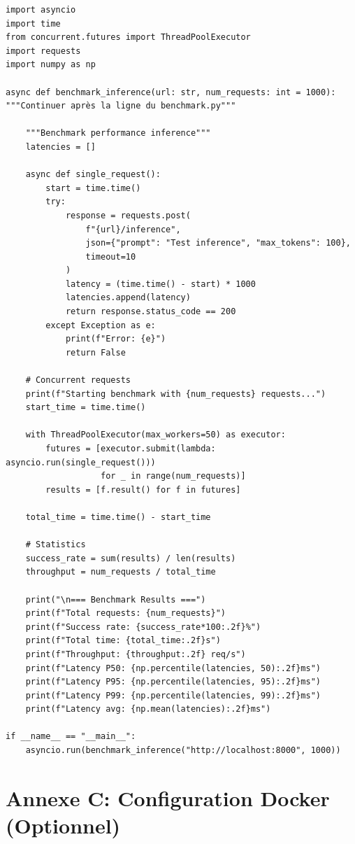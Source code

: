 \documentclass[12pt,a4paper]{article}
\begin{document}
\begin{lstlisting}[caption={benchmark.py}]
import asyncio
import time
from concurrent.futures import ThreadPoolExecutor
import requests
import numpy as np

async def benchmark_inference(url: str, num_requests: int = 1000):
"""Continuer après la ligne du benchmark.py"""

    """Benchmark performance inference"""
    latencies = []
    
    async def single_request():
        start = time.time()
        try:
            response = requests.post(
                f"{url}/inference",
                json={"prompt": "Test inference", "max_tokens": 100},
                timeout=10
            )
            latency = (time.time() - start) * 1000
            latencies.append(latency)
            return response.status_code == 200
        except Exception as e:
            print(f"Error: {e}")
            return False
    
    # Concurrent requests
    print(f"Starting benchmark with {num_requests} requests...")
    start_time = time.time()
    
    with ThreadPoolExecutor(max_workers=50) as executor:
        futures = [executor.submit(lambda: asyncio.run(single_request())) 
                   for _ in range(num_requests)]
        results = [f.result() for f in futures]
    
    total_time = time.time() - start_time
    
    # Statistics
    success_rate = sum(results) / len(results)
    throughput = num_requests / total_time
    
    print("\n=== Benchmark Results ===")
    print(f"Total requests: {num_requests}")
    print(f"Success rate: {success_rate*100:.2f}%")
    print(f"Total time: {total_time:.2f}s")
    print(f"Throughput: {throughput:.2f} req/s")
    print(f"Latency P50: {np.percentile(latencies, 50):.2f}ms")
    print(f"Latency P95: {np.percentile(latencies, 95):.2f}ms")
    print(f"Latency P99: {np.percentile(latencies, 99):.2f}ms")
    print(f"Latency avg: {np.mean(latencies):.2f}ms")

if __name__ == "__main__":
    asyncio.run(benchmark_inference("http://localhost:8000", 1000))
\end{lstlisting}

\section{Annexe C: Configuration Docker (Optionnel)}
\end{document}

